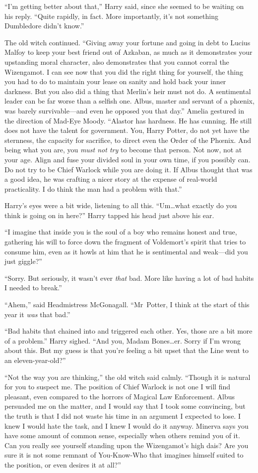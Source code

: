 “I’m getting better about that,” Harry said, since she seemed to be waiting on his reply. “Quite rapidly, in fact. More importantly, it’s not something Dumbledore didn’t know.”

The old witch continued. “Giving away your fortune and going in debt to Lucius Malfoy to keep your best friend out of Azkaban, as much as it demonstrates your upstanding moral character, also demonstrates that you cannot corral the Wizengamot. I can see now that you did the right thing for yourself, the thing you had to do to maintain your lease on sanity and hold back your inner darkness. But you also did a thing that Merlin’s heir must not do. A sentimental leader can be far worse than a selfish one. Albus, master and servant of a phœnix, was barely survivable—and even he opposed you that day.” Amelia gestured in the direction of Mad-Eye Moody. “Alastor has hardness. He has cunning. He still does not have the talent for government. You, Harry Potter, do not yet have the sternness, the capacity for sacrifice, to direct even the Order of the Phœnix. And being what you are, you \emph{must not try} to become that person. Not now, not at your age. Align and fuse your divided soul in your own time, if you possibly can. Do not try to be Chief Warlock while you are doing it. If Albus thought that was a good idea, he was crafting a nicer story at the expense of real-world practicality. I do think the man had a problem with that.”

Harry’s eyes were a bit wide, listening to all this. “Um…what exactly do you think is going on in here?” Harry tapped his head just above his ear.

“I imagine that inside you is the soul of a boy who remains honest and true, gathering his will to force down the fragment of Voldemort’s spirit that tries to consume him, even as it howls at him that he is sentimental and weak—did you just giggle?”

“Sorry. But seriously, it wasn’t ever \emph{that} bad. More like having a lot of bad habits I needed to break.”

“Ahem,” said Headmistress McGonagall. “Mr~Potter, I think at the start of this year it \emph{was} that bad.”

“Bad habits that chained into and triggered each other. Yes, those are a bit more of a problem.” Harry sighed. “And you, Madam Bones…er. Sorry if I’m wrong about this. But my guess is that you’re feeling a bit upset that the Line went to an eleven-year-old?”

“Not the way you are thinking,” the old witch said calmly. “Though it is natural for you to suspect me. The position of Chief Warlock is not one I will find pleasant, even compared to the horrors of Magical Law Enforcement. Albus persuaded me on the matter, and I would say that I took some convincing, but the truth is that I did not waste his time in an argument I expected to lose. I knew I would hate the task, and I knew I would do it anyway. Minerva says you have some amount of common sense, especially when others remind you of it. Can you really see yourself standing upon the Wizengamot’s high dais? Are you sure it is not some remnant of You-Know-Who that imagines himself suited to the position, or even desires it at all?”

